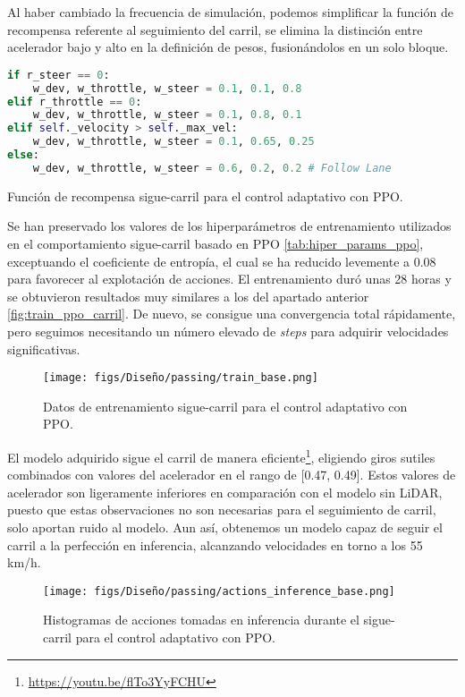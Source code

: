 Al haber cambiado la frecuencia de simulación, podemos simplificar la función de recompensa referente al seguimiento del carril, se elimina la distinción entre acelerador bajo y alto en la definición de pesos, fusionándolos en un solo bloque.

\begin{code}[h]
\begin{lstlisting}[language=Python]
if r_steer == 0:
    w_dev, w_throttle, w_steer = 0.1, 0.1, 0.8
elif r_throttle == 0:
    w_dev, w_throttle, w_steer = 0.1, 0.8, 0.1
elif self._velocity > self._max_vel:
    w_dev, w_throttle, w_steer = 0.1, 0.65, 0.25
else:
    w_dev, w_throttle, w_steer = 0.6, 0.2, 0.2 # Follow Lane
\end{lstlisting}
\caption[Función de recompensa sigue-carril para el control adaptativo con \ac{PPO}]{Función de recompensa sigue-carril para el control adaptativo con \ac{PPO}.}
\label{cod:rew_carril_ppo_passing}
\end{code}

Se han preservado los valores de los hiperparámetros de entrenamiento utilizados en el comportamiento sigue-carril basado en \ac{PPO} \ref{tab:hiper_params_ppo}, exceptuando el coeficiente de entropía, el cual se ha reducido levemente a 0.08 para favorecer al explotación de acciones. El entrenamiento duró unas 28 horas y se obtuvieron resultados muy similares a los del apartado anterior \ref{fig:train_ppo_carril}. De nuevo, se consigue una convergencia total rápidamente, pero seguimos necesitando un número elevado de \textit{steps} para adquirir velocidades significativas.

\begin{figure}[ht]
  \centering
  \texttt{[image: figs/Diseño/passing/train\_base.png]}
  \caption{Datos de entrenamiento sigue-carril para el control adaptativo con \ac{PPO}.}
  \label{fig:passing_train_base}
\end{figure}

El modelo adquirido sigue el carril de manera eficiente\footnote{\url{https://youtu.be/flTo3YyFCHU}}, eligiendo giros sutiles combinados con valores del acelerador en el rango de [0.47, 0.49]. Estos valores de acelerador son ligeramente inferiores en comparación con el modelo sin \ac{LiDAR}, puesto que estas observaciones no son necesarias para el seguimiento de carril, solo aportan ruido al modelo. Aun así, obtenemos un modelo capaz de seguir el carril a la perfección en inferencia, alcanzando velocidades en torno a los 55 km/h.
\begin{figure}[ht]
  \centering
  \texttt{[image: figs/Diseño/passing/actions\_inference\_base.png]}
  \caption{Histogramas de acciones tomadas en inferencia durante el sigue-carril para el control adaptativo con \ac{PPO}.}
  \label{fig:passing_actions_inf_base}
\end{figure}

